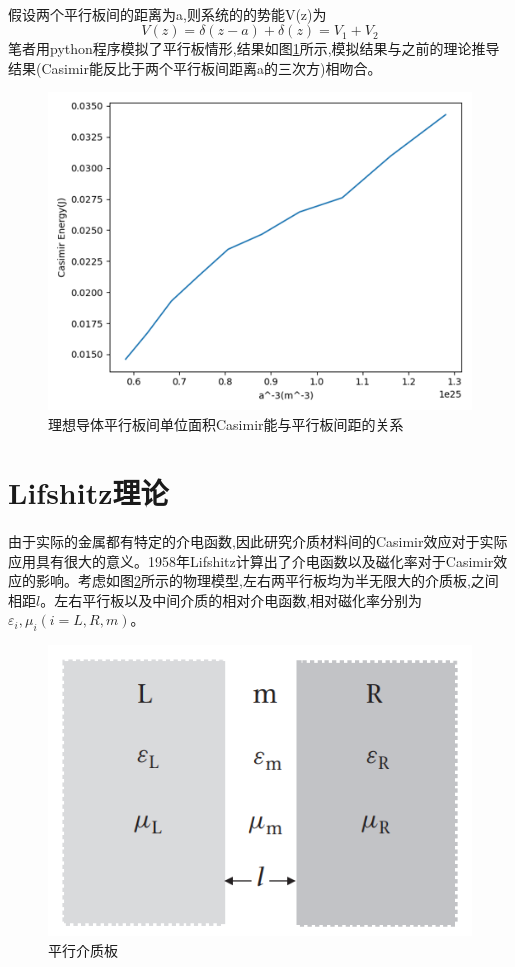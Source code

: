 \paragraph*{}
假设两个平行板间的距离为a,则系统的的势能V(z)为
$$
V(z)=\delta(z-a)+\delta(z)=V_{1}+V_{2}
$$
笔者用python程序模拟了平行板情形,结果如图\ref{fig:6}所示,模拟结果与之前的理论推导结果(Casimir能反比于两个平行板间距离a的三次方)相吻合。
\begin{figure}[h]
	\centering
	\includegraphics[width=0.7\linewidth]{figures/世界线3}
	\caption{理想导体平行板间单位面积Casimir能与平行板间距的关系}
	\label{fig:6}
\end{figure}



\section{Lifshitz理论}
\paragraph*{}
由于实际的金属都有特定的介电函数,因此研究介质材料间的Casimir效应对于实际应用具有很大的意义。1958年Lifshitz计算出了介电函数以及磁化率对于Casimir效应的影响\cite{Lifshitz_1958}。考虑如图\ref{fig:3}所示的物理模型,左右两平行板均为半无限大的介质板,之间相距$l$。左右平行板以及中间介质的相对介电函数,相对磁化率分别为$\varepsilon _i,\mu _i(i=L,R,m)$。
\begin{figure}[h]
	\centering
	\includegraphics[width=0.7\linewidth]{figures/lifshitz1}
	\caption{平行介质板}
	\label{fig:3}
\end{figure}
